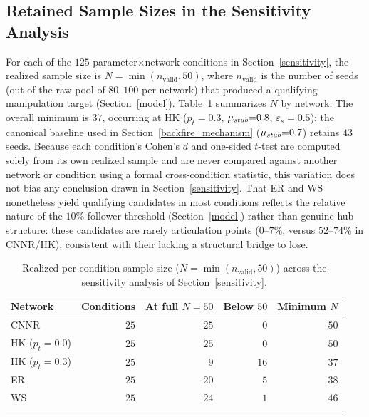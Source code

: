\documentclass[pdflatex,sn-mathphys-num]{sn-jnl}%
\theoremstyle{thmstyleone}%
\theoremstyle{thmstyletwo}%
\theoremstyle{thmstylethree}%
\def\Stubbornness{\mu_{\it stub}}
\def\ThofOpPreval{\varepsilon_s}
\begin{document}
\fi

\begin{appendices}
\section{Retained Sample Sizes in the Sensitivity Analysis}\label{app:retained_n}

For each of the $125$ parameter$\times$network conditions in Section~\ref{sensitivity},
the realized sample size is $N=\min(n_{\text{valid}},50)$, where $n_{\text{valid}}$ is
the number of seeds (out of the raw pool of $80$--$100$ per network) that produced a
qualifying manipulation target (Section~\ref{model}). Table~\ref{tab:retained_n}
summarizes $N$ by network. The overall minimum is $37$, occurring at HK
($p_t{=}0.3$, $\Stubbornness{=}0.8$, $\ThofOpPreval{=}0.5$); the canonical baseline
used in Section~\ref{backfire_mechanism} ($\Stubbornness{=}0.7$) retains $43$ seeds.
Because each condition's
Cohen's $d$ and one-sided $t$-test are computed solely from its own realized sample and
are never compared against another network or condition using a formal
cross-condition statistic, this variation does not bias any conclusion drawn in
Section~\ref{sensitivity}. That ER and WS nonetheless yield qualifying candidates in
most conditions reflects the relative nature of the $10\%$-follower threshold
(Section~\ref{model}) rather than genuine hub structure: these candidates are rarely
articulation points ($0$--$7\%$, versus $52$--$74\%$ in CNNR/HK), consistent with their
lacking a structural bridge to lose.

\begin{table}[h]
  \tabcolsep=5pt
  \centering
  \caption{Realized per-condition sample size ($N=\min(n_{\text{valid}},50)$) across
  the sensitivity analysis of Section~\ref{sensitivity}.}\label{tab:retained_n}
  \begin{tabular}{lrrrr}
    \toprule
    Network & Conditions & At full $N{=}50$ & Below $50$ & Minimum $N$ \\
    \midrule
    CNNR             & $25$ & $25$ & $0$  & $50$ \\
    HK ($p_t{=}0.0$) & $25$ & $25$ & $0$  & $50$ \\
    HK ($p_t{=}0.3$) & $25$ & $9$  & $16$ & $37$ \\
    ER               & $25$ & $20$ & $5$  & $38$ \\
    WS               & $25$ & $24$ & $1$  & $46$ \\
    \bottomrule\\
  \end{tabular}
\end{table}

\end{appendices}

\newpage

%

\end{document}
